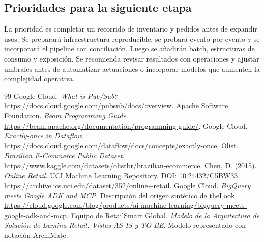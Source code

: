 \documentclass[11pt,a4paper]{article}
\begin{document}
\subsection{Prioridades para la siguiente etapa}
La prioridad es completar un recorrido de inventario y pedidos antes de expandir usos. Se preparará infraestructura reproducible, se probará evento por evento y se incorporará el pipeline con conciliación. Luego se añadirán batch, estructuras de consumo y exposición. Se recomienda revisar resultados con operaciones y ajustar umbrales antes de automatizar actuaciones o incorporar modelos que aumenten la complejidad operativa.

\FloatBarrier\clearpage
{}
\begin{thebibliography}{99}
\small
{} Google Cloud. \textit{What is Pub/Sub?} \url{https://docs.cloud.google.com/pubsub/docs/overview}.
 Apache Software Foundation. \textit{Beam Programming Guide}. \url{https://beam.apache.org/documentation/programming-guide/}.
 Google Cloud. \textit{Exactly-once in Dataflow}. \url{https://docs.cloud.google.com/dataflow/docs/concepts/exactly-once}.
 Olist. \textit{Brazilian E-Commerce Public Dataset}. \url{https://www.kaggle.com/datasets/olistbr/brazilian-ecommerce}.
 Chen, D. (2015). \textit{Online Retail}. UCI Machine Learning Repository. DOI: 10.24432/C5BW33. \url{https://archive.ics.uci.edu/dataset/352/online+retail}.
 Google Cloud. \textit{BigQuery meets Google ADK and MCP}. Descripción del origen sintético de theLook. \url{https://cloud.google.com/blog/products/ai-machine-learning/bigquery-meets-google-adk-and-mcp}.
 Equipo de RetailSmart Global. \textit{Modelo de la Arquitectura de Solución de Lumina Retail. Vistas AS-IS y TO-BE}. Modelo representado con notación ArchiMate.
\end{thebibliography}
\end{document}

